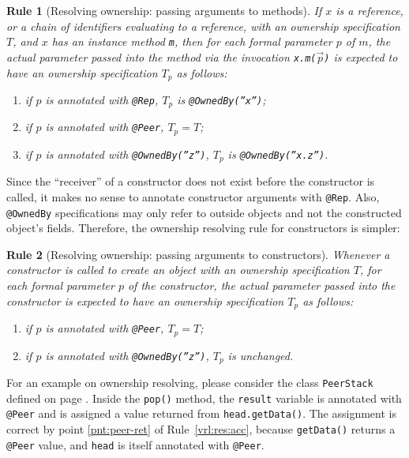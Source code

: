 \documentclass{pracamgr}
\theoremstyle{break}
\theoremstyle{break}
\theoremstyle{break}
\newtheorem{verrule}{Rule}
\begin{document}
\begin{verrule}[Resolving ownership: passing arguments to methods]
  If $x$ is a reference, or a chain of identifiers evaluating to a
  reference, with an ownership specification $T$, and $x$ has an
  instance method \texttt{m}, then for each formal parameter $p$ of
  $m$, the actual parameter passed into the method via the invocation
  \texttt{x.m($\vec{p}$)} is expected to have an ownership
  specification $T_p$ as follows:
  \begin{enumerate}[label=(\arabic*)]
  \item if $p$ is annotated with \texttt{@Rep}, $T_p$ is \texttt{@OwnedBy(''x'')};
  \item if $p$ is annotated with \texttt{@Peer}, $T_p = T$;
  \item if $p$ is annotated with \texttt{@OwnedBy(''z'')}, $T_p$ is
    \texttt{@OwnedBy(''x.z'')}.
  \end{enumerate}
\end{verrule}

Since the ``receiver'' of a constructor does not exist before the
constructor is called, it makes no sense to annotate constructor
arguments with \texttt{@Rep}. Also, \texttt{@OwnedBy} specifications
may only refer to outside objects and not the constructed object's
fields. Therefore, the ownership resolving rule for constructors is
simpler:

\begin{verrule}[Resolving ownership: passing arguments to constructors]
  Whenever a constructor is called to create an object with an
  ownership specification $T$, for each formal parameter $p$ of the
  constructor, the actual parameter passed into the constructor is
  expected to have an ownership specification $T_p$ as follows:
  \begin{enumerate}[label=(\arabic*)]
  \item if $p$ is annotated with \texttt{@Peer}, $T_p = T$;
  \item if $p$ is annotated with \texttt{@OwnedBy(''z'')}, $T_p$ is
    unchanged.
  \end{enumerate}
\end{verrule}

For an example on ownership resolving, please consider the class
\texttt{PeerStack} defined on page \pageref{lst:stack-peer}. Inside
the \texttt{pop()} method, the \texttt{result} variable is annotated
with \texttt{@Peer} and is assigned a value returned from
\texttt{head.getData()}. The assignment is correct by point
\ref{pnt:peer-ret} of Rule~\ref{vrl:res:acc}, because
\texttt{getData()} returns a \texttt{@Peer} value, and \texttt{head}
is itself annotated with \texttt{@Peer}.
\end{document}
